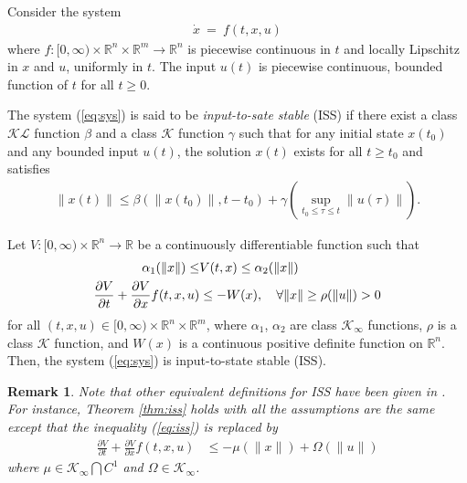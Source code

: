 \documentclass[twoside,leqno,onecolumn]{article}
\newtheorem{remark}{Remark}
\begin{document}
Consider the system
\begin{align}
\label{eq:sys}
\dot{x} ~=~f(t,x,u)
\end{align}
where $f: [0,\infty)\times \mathbb{R}^n\times\mathbb{R}^m\rightarrow \mathbb{R}^n$ is piecewise continuous in $t$ and locally Lipschitz in $x$ and $u$, uniformly in $t$. The input $u(t)$ is piecewise continuous, bounded function of $t$ for all $t\geq0$.


\begin{Definition}
\label{def:ISS}
The system (\ref{eq:sys}) is said to be \emph{input-to-sate stable} (ISS) if there exist a class $\mathcal{KL}$ function $\beta$ and a class $\mathcal{K}$ function $\gamma$ such that for any initial state $x(t_0)$ and any bounded input $u(t)$, the solution $x(t)$ exists for all $t\geq t_0$ and satisfies
\begin{align*}
\|x(t)\|\leq \beta(\|x(t_0)\|,t-t_0) + \gamma(\sup_{t_0\leq\tau\leq t} \|u(\tau)\|).
\end{align*}
\end{Definition}

\begin{theorem}
\label{thm:iss}
Let $V: [0,\infty)\times\mathbb{R}^n\rightarrow \mathbb{R}$ be a continuously differentiable function such that
\begin{align}
\label{eq:iss}
\alpha_1(\|x\|) \leq& V(t,x)\leq \alpha_2(\|x\|)\notag\\
\frac{\partial V}{\partial t} + \frac{\partial V}{\partial x}f(t,x,u)&\leq -W(x),\quad \forall \|x\|\geq\rho(\|u\|)>0
\end{align}
for all $(t,x,u)\in[0,\infty)\times\mathbb{R}^n\times \mathbb{R}^m$, where $\alpha_1$, $\alpha_2$ are class $\mathcal{K}_{\infty}$ functions, $\rho$
is a class $\mathcal{K}$ function, and $W(x)$ is a continuous positive definite function on $\mathbb{R}^n$. Then, the system (\ref{eq:sys}) is input-to-state stable (ISS).
\end{theorem}

\begin{remark}
Note that other equivalent definitions for ISS have been given in \cite[pp. 1974-1975]{Mali05}. For instance, Theorem \ref{thm:iss} holds with all the assumptions are the same except that the inequality (\ref{eq:iss}) is replaced by
\begin{align*}
\frac{\partial V}{\partial t} + \frac{\partial V}{\partial x}f(t,x,u)&\leq -\mu(\|x\|) + \Omega(\|u\|)
\end{align*}
where $\mu\in\mathcal{K}_{\infty}\bigcap C^1$ and $\Omega\in\mathcal{K}_{\infty}$.
\end{remark}
\end{document}
